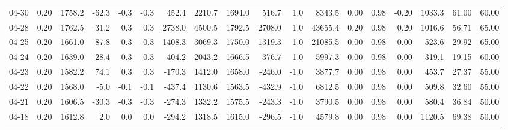 \begin{threeparttable}
{\begin{tabular}{lrrrrrrrrrrrrrrrrr}
  04-30 &     0.20 & 1758.2 &             -62.3 &              -0.3 &               -0.3 &              452.4 & 2210.7 & 1694.0 &      516.7 &                      1.0 &              8343.5 &       0.00 &      0.98 &          -0.20 &           1033.3 &           61.00 &                  60.00 \\
  04-28 &     0.20 & 1762.5 &              31.2 &               0.3 &                0.3 &             2738.0 & 4500.5 & 1792.5 &     2708.0 &                      1.0 &             43655.4 &       0.20 &      0.98 &           0.20 &           1016.6 &           56.71 &                  65.00 \\
  04-25 &     0.20 & 1661.0 &              87.8 &               0.3 &                0.3 &             1408.3 & 3069.3 & 1750.0 &     1319.3 &                      1.0 &             21085.5 &       0.00 &      0.98 &           0.00 &            523.6 &           29.92 &                  65.00 \\
  04-24 &     0.20 & 1639.0 &              28.4 &               0.3 &                0.3 &              404.2 & 2043.2 & 1666.5 &      376.7 &                      1.0 &              5997.3 &       0.00 &      0.98 &           0.00 &            319.1 &           19.15 &                  60.00 \\
  04-23 &     0.20 & 1582.2 &              74.1 &               0.3 &                0.3 &             -170.3 & 1412.0 & 1658.0 &     -246.0 &                     -1.0 &              3877.7 &       0.00 &      0.98 &           0.00 &            453.7 &           27.37 &                  55.00 \\
  04-22 &     0.20 & 1568.0 &              -5.0 &              -0.1 &               -0.1 &             -437.4 & 1130.6 & 1563.5 &     -432.9 &                     -1.0 &              6812.5 &       0.00 &      0.98 &           0.00 &            509.8 &           32.60 &                  55.00 \\
  04-21 &     0.20 & 1606.5 &             -30.3 &              -0.3 &               -0.3 &             -274.3 & 1332.2 & 1575.5 &     -243.3 &                     -1.0 &              3790.5 &       0.00 &      0.98 &           0.00 &            580.4 &           36.84 &                  50.00 \\
  04-18 &     0.20 & 1612.8 &               2.0 &               0.0 &                0.0 &             -294.2 & 1318.5 & 1615.0 &     -296.5 &                     -1.0 &              4579.8 &       0.00 &      0.98 &           0.00 &           1120.5 &           69.38 &                  50.00 \\

\end{tabular}}
\end{threeparttable}
